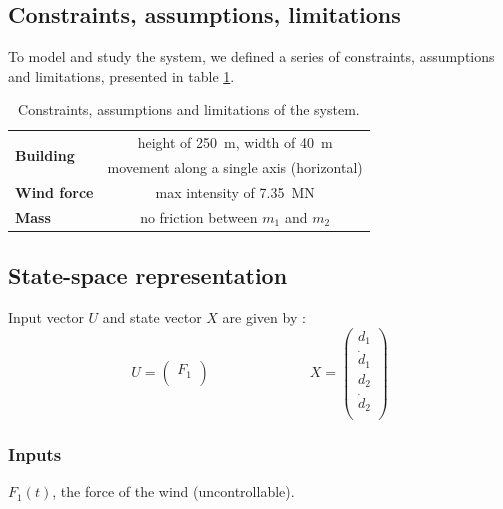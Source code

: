 \documentclass[a4paper, 12pt]{article}
\begin{document}
    \subsection{Constraints, assumptions, limitations}
    To model and study the system, we defined a series of constraints, assumptions and limitations, presented in table \ref{tab:constraints_assumptions_limitations}.\par
    \begin{table}[H]
        \centering
        \begin{tabular}{|l|c|}
            \hline
            \multirow{2}{*}{{\bf Building}} & height of \SI{250}{\meter}, width of \SI{40}{\meter}\\ & movement along a single axis (horizontal)\\\hline
            {\bf Wind force} & max intensity of \SI{7.35}{\mega\newton}\\ \hline
            {\bf Mass} & no friction between $m_1$ and $m_2$\\ \hline
        \end{tabular}
        \caption{Constraints, assumptions and limitations of the system.}
        \label{tab:constraints_assumptions_limitations}
    \end{table}
    
    \subsection{State-space representation}
    Input vector $U$ and state vector $X$ are given by :
    $$
    U = \begin{pmatrix}
        F_1 \\
    \end{pmatrix}
    \hspace{3cm}
    X = \begin{pmatrix}
        d_1 \\
        \dot d_1 \\
        d_2 \\ 
        \dot d_2 \\
    \end{pmatrix}
    $$
    
    \subsubsection{Inputs}
    $F_1(t)$, the force of the wind (uncontrollable).
    
\end{document}
